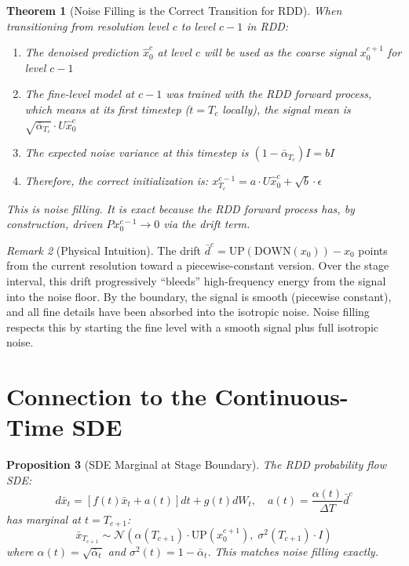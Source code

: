 \documentclass[11pt]{article}
\newtheorem{theorem}{Theorem}[section]
\newtheorem{proposition}[theorem]{Proposition}
\theoremstyle{remark}
\newtheorem{remark}[theorem]{Remark}
\begin{document}
\begin{theorem}[Noise Filling is the Correct Transition for RDD]\label{thm:correct}
When transitioning from resolution level $c$ to level $c-1$ in RDD:
\begin{enumerate}
    \item The denoised prediction $\hat{x}_0^c$ at level $c$ will be used as the coarse signal $x_0^{c+1}$ for level $c-1$
    \item The fine-level model at $c-1$ was trained with the RDD forward process, which means at its first timestep ($t = T_c$ locally), the signal mean is $\sqrt{\bar{\alpha}_{T_c}} \cdot U\hat{x}_0^c$
    \item The expected noise variance at this timestep is $(1-\bar{\alpha}_{T_c})I = bI$
    \item Therefore, the correct initialization is: $x_{T_c}^{c-1} = a \cdot U\hat{x}_0^c + \sqrt{b} \cdot \epsilon$
\end{enumerate}
This is noise filling. It is exact because the RDD forward process has, by construction, driven $Px_0^{c-1} \to 0$ via the drift term.
\end{theorem}

\begin{remark}[Physical Intuition]
The drift $\bar{d}^c = \mathrm{UP}(\mathrm{DOWN}(x_0)) - x_0$ points from the current resolution toward a piecewise-constant version. Over the stage interval, this drift progressively ``bleeds'' high-frequency energy from the signal into the noise floor. By the boundary, the signal is smooth (piecewise constant), and all fine details have been absorbed into the isotropic noise. Noise filling respects this by starting the fine level with a smooth signal plus full isotropic noise.
\end{remark}

\section{Connection to the Continuous-Time SDE}

\begin{proposition}[SDE Marginal at Stage Boundary]\label{prop:sde}
The RDD probability flow SDE:
\begin{equation}
    d\bar{x}_t = \left[f(t)\bar{x}_t + a(t)\right]dt + g(t)dW_t, \quad a(t) = \frac{\alpha(t)}{\Delta T}\bar{d}^c
\end{equation}
has marginal at $t = T_{c+1}$:
\begin{equation}
    \bar{x}_{T_{c+1}} \sim \mathcal{N}\!\left(\alpha(T_{c+1}) \cdot \mathrm{UP}(x_0^{c+1}),\; \sigma^2(T_{c+1}) \cdot I\right)
\end{equation}
where $\alpha(t) = \sqrt{\bar{\alpha}_t}$ and $\sigma^2(t) = 1 - \bar{\alpha}_t$. This matches noise filling exactly.
\end{proposition}
\end{document}
